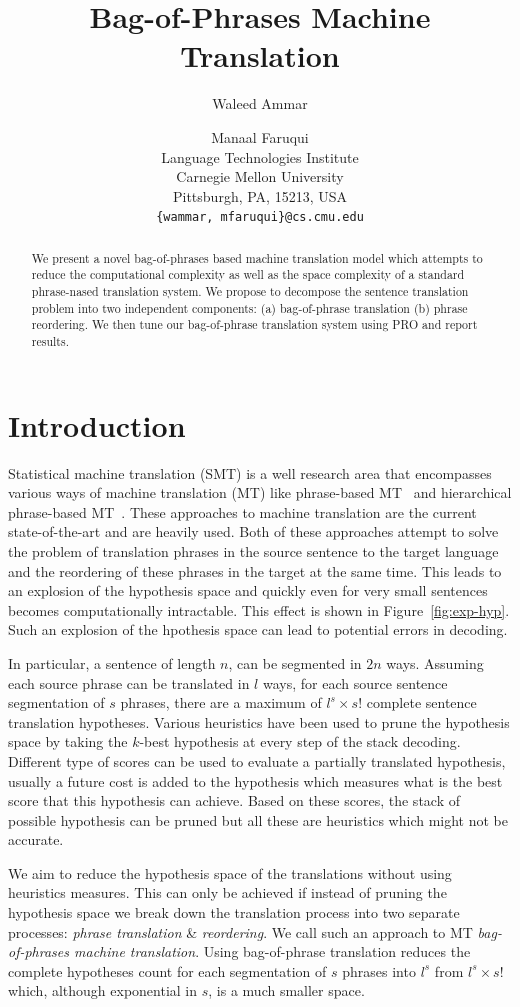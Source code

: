 \documentclass[11pt]{article}
\title{Bag-of-Phrases Machine Translation}
\author{Waleed Ammar \and Manaal Faruqui\\
  Language Technologies Institute \\
  Carnegie Mellon University \\
  Pittsburgh, PA, 15213, USA \\
  {\tt \{wammar, mfaruqui\}@cs.cmu.edu} 
}
\date{}
\numberwithin{equation}{section}
\begin{document}
\maketitle
\begin{abstract}
	
We present a novel bag-of-phrases based machine translation model which attempts to reduce the
computational complexity as well as the space complexity of a standard phrase-nased translation
system. We propose to decompose the sentence translation problem into two independent components: (a) 
bag-of-phrase translation (b) phrase reordering. We then tune our bag-of-phrase translation system using PRO and report results.
\end{abstract}

\section{Introduction}
Statistical machine translation (SMT) is a well research area that encompasses various ways of machine translation (MT)
like phrase-based MT~\cite{Koehn:2003:SPT:1073445.1073462} and hierarchical phrase-based MT~\cite{Chiang:2007:HPT:1268656.1268659}.
These approaches to machine translation are the current state-of-the-art and are heavily used. Both of these approaches
attempt to solve the problem of translation phrases in the source sentence to the target language and the reordering
of these phrases in the target at the same time. This leads to an explosion of the hypothesis space and quickly
even for very small sentences becomes computationally intractable. This effect is shown in Figure~\ref{fig:exp-hyp}. Such an explosion
of the hpothesis space can lead to potential errors in decoding.

In particular, a sentence of length $n$, can be segmented in $2n$ ways. Assuming each source phrase can be translated in $l$ ways, for each source sentence segmentation of $s$ phrases, there are a maximum of $l^s \times s!$ complete sentence translation hypotheses.
Various heuristics have been used to prune the hypothesis space by taking the $k$-best hypothesis at every step of the stack decoding.
Different type of scores can be used to evaluate a partially translated hypothesis, usually a future cost is added to the hypothesis 
which measures what is the best score that this hypothesis can achieve. Based on these scores, the stack of possible hypothesis can
be pruned but all these are heuristics which might not be accurate.

We aim to reduce the hypothesis space of the translations without using heuristics measures. This can only be achieved if instead
of pruning the hypothesis space we break down the translation process into two separate processes: \textit{phrase translation} \& 
\textit{reordering}. We call such an approach to MT \textit{bag-of-phrases machine translation}. Using bag-of-phrase translation reduces the complete hypotheses count for each segmentation of $s$ phrases into $l^s$ from $l^s \times s!$ which, although exponential in $s$, is a much smaller space.
\end{document}
